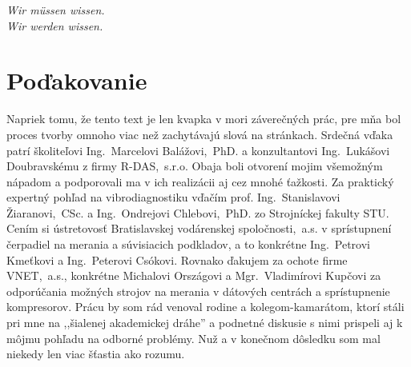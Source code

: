 \thispagestyle{empty}
\vspace*{\fill}

\begin{center}
\settowidth{}
\parbox{\longest}{
  \hrulefill\hspace{0.2cm} \decofourleft\decofourright \hspace{0.2cm} \hrulefill\par
  \raggedright{
  \itshape
  	Wir müssen wissen. \\ Wir werden wissen.\par
  }   
  \par
  \hrulefill\hspace{0.2cm} \decofourleft\decofourright\hspace{0.2cm} \hrulefill\par
}
\end{center}

\vspace*{\fill}
\section*{Poďakovanie}
{\linespread{1.0}\small Napriek tomu, že tento text je len kvapka v mori záverečných prác, pre mňa bol proces tvorby omnoho viac než zachytávajú slová na stránkach. Srdečná vďaka patrí školiteľovi Ing.~Marcelovi Balážovi,~PhD. a konzultantovi Ing.~Lukášovi Doubravskému z firmy R-DAS,~s.r.o. Obaja boli otvorení mojim všemožným nápadom a podporovali ma v ich realizácii aj cez mnohé ťažkosti. Za praktický expertný pohľad na vibrodiagnostiku vďačím prof. Ing.~Stanislavovi Žiaranovi,~CSc. a Ing.~Ondrejovi Chlebovi,~PhD. zo Strojníckej fakulty STU. Cením si ústretovosť Bratislavskej vodárenskej spoločnosti,~a.s. v sprístupnení čerpadiel na merania a súvisiacich podkladov, a to konkrétne Ing.~Petrovi Kmeťkovi a Ing.~Peterovi Csókovi. Rovnako ďakujem za ochote firme VNET,~a.s., konkrétne Michalovi Országovi a Mgr.~Vladimírovi Kupčovi za odporúčania možných strojov na merania v dátových centrách a sprístupnenie kompresorov. Prácu by som rád venoval rodine a kolegom-kamarátom, ktorí stáli pri mne na ,,šialenej akademickej dráhe'' a podnetné diskusie s nimi prispeli aj k môjmu pohľadu na odborné problémy. Nuž a v konečnom dôsledku som mal niekedy len viac šťastia ako rozumu.}
\vspace{3cm}